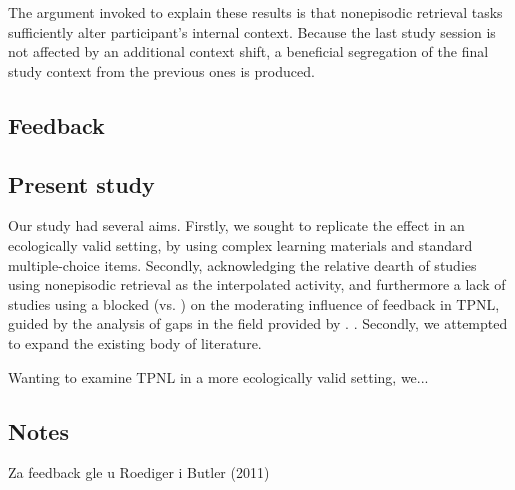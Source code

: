\documentclass[../main.tex]{subfiles}
\begin{document}
The argument invoked to explain these results is that nonepisodic retrieval tasks sufficiently alter participant's internal context. Because the last study session is not affected by an additional context shift, a beneficial segregation of the final study context from the previous ones is produced.
	


\subsection{Feedback}


\subsection{Present study}

Our study had several aims. Firstly, we sought to replicate the effect in an ecologically valid setting, by using complex learning materials and standard multiple-choice items. Secondly, acknowledging the relative dearth of studies using nonepisodic retrieval as the interpolated activity, and furthermore a lack of studies using a blocked (vs. ) on the moderating influence of feedback in TPNL,    guided by the analysis of gaps in the field provided by \cite{chanRetrievalPotentiatesNew2018}. .  Secondly, we attempted to expand the existing body of literature.

Wanting to examine TPNL in a more ecologically valid setting, we...





{
	\biblio
}

\subsection{Notes}



Za feedback gle u Roediger i Butler (2011)
\end{document}
